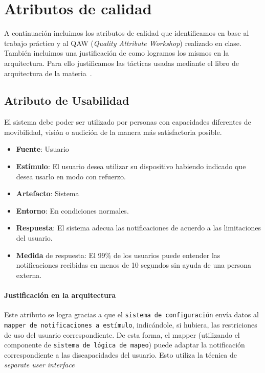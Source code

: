 \section{Atributos de calidad}

A continuación incluimos los atributos de calidad que identificamos en base al trabajo práctico y
al QAW (\textit{Quality Attribute Workshop}) realizado en clase. También incluimos una justificación de como
logramos los mismos en la arquitectura. Para ello justificamos las tácticas usadas mediante el libro de 
arquitectura de la materia~\cite{lenbass}.

\subsection{Atributo de Usabilidad}
El sistema debe poder ser utilizado por personas con capacidades diferentes de movibilidad, visión o audición de la manera más satisfactoria posible.

\begin{itemize}
  \item \textbf{Fuente}: Usuario
  \item \textbf{Estímulo}: El usuario desea utilizar su dispositivo habiendo indicado que desea usarlo en modo con refuerzo.
  \item \textbf{Artefacto}: Sistema
  \item \textbf{Entorno}: En condiciones normales.
  \item \textbf{Respuesta}: El sistema adecua las notificaciones de acuerdo a las limitaciones del usuario.
  \item \textbf{Medida} de respuesta: El 99\% de los usuarios puede entender las notificaciones recibidas en menos de 10 segundos sin ayuda de una persona externa.
\end{itemize}

\paragraph{Justificación en la arquitectura}
Este atributo se logra gracias a que el \texttt{sistema de configuración} envía datos al \texttt{mapper de notificaciones a estímulo}, indicándole, si hubiera, las restriciones de uso del usuario correspondiente. De esta forma, el mapper (utilizando el componente de \texttt{sistema de lógica de mapeo}) puede adaptar la notificación correspondiente a las discapacidades del usuario. Esto utiliza la técnica de \emph{separate user interface}


